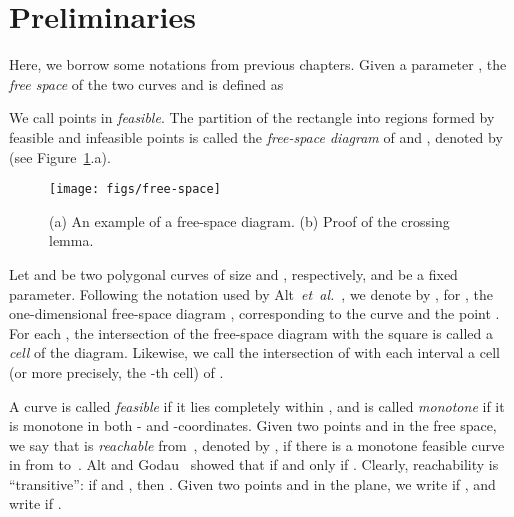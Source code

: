 \documentclass[12pt]{dalthesis}
\newcommand{\etal}{{\em et~al.\/}}
\newcommand{\REM}[1]{}
\newcommand{\Frechet}{Fr\'echet }
\newcommand{\fs}{free-space }
\begin{document}
\section{Preliminaries} 
\label{sec:preliminaries}

\REM{
A {\em polygonal curve\/} in  is  a continuous function 
 such that for each ,
the restriction of  to the interval  
is affine (i.e., forms a line segment).
The integer  is called the {\em size\/} of .
For each , 
we denote the line segment  by .  

A {\em monotone reparametrization} of  
is a continuous non-decreasing function 
with  and .
Given two polygonal curves  and  of size  and , respectively, 
the {\em \Frechet distance\/} between  and  is defined as

where  denotes the Euclidean metric, 
and  and  range over all monotone reparameterizations of 
 and , respectively.
}
Here, we borrow some notations from previous 
chapters.
Given a parameter ,
the {\em free space\/} of the two curves  and  is defined as


We call points in  \emph{feasible}.
The partition of the rectangle  
into regions formed by feasible and infeasible points
is called the \emph{\fs diagram} of  and , denoted by 
(see Figure~\ref{fig:free-space}.a).


\begin{figure}[t]
	\centering
\texttt{[image: figs/free-space]}
	\caption{(a) An example of a \fs diagram.
	(b) Proof of the crossing lemma.}
	\label{fig:free-space}
	\vspace{-0.5em}	
\end{figure}

Let  and  be two polygonal curves of size  and , respectively,
and  be a fixed parameter.
Following the notation used by Alt~\etal~\cite{AltERW03a},
we denote by , for , 
the one-dimensional \fs diagram ,
corresponding to the curve  and the point . 
For each ,
the intersection of the free-space diagram with the square  
is called a \emph{cell} of the diagram. Likewise, we call the intersection of  with each interval  a cell 
(or more precisely, the -th cell) of .

A curve is called \emph{feasible} if it lies completely within ,
and is called {\em monotone} if it is monotone in both - and -coordinates.
Given two points  and  in the free space, we say that 
 is \emph{reachable} from~,
denoted by ,
if there is a monotone feasible curve in  from  to~.
Alt and Godau~\cite{AltG95} showed that  
if and only if .
Clearly, reachability is ``transitive'':
if  and , then .
Given two points  and  in the plane, 
we write  if ,
and write  if .
\end{document}
